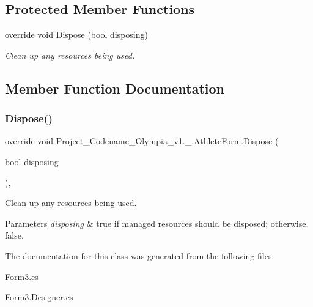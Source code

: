 \subsection*{Protected Member Functions}
\begin{DoxyCompactItemize}
\item 
override void \hyperlink{classProject__Codename__Olympia__v1_1_1__0_1_1AthleteForm_a96cf7be874bb0c7f6e0a0a4039cc19eb}{Dispose} (bool disposing)
\begin{DoxyCompactList}\small\item\em Clean up any resources being used. \end{DoxyCompactList}\end{DoxyCompactItemize}


\subsection{Member Function Documentation}
\mbox{\label{classProject__Codename__Olympia__v1_1_1__0_1_1AthleteForm_a96cf7be874bb0c7f6e0a0a4039cc19eb}} 
\subsubsection{\texorpdfstring{Dispose()}{Dispose()}}
{\footnotesize\ttfamily override void Project\+\_\+\+Codename\+\_\+\+Olympia\+\_\+v1.\+\_.\+Athlete\+Form.\+Dispose (\begin{DoxyParamCaption}\item[{bool}]{disposing }\end{DoxyParamCaption})\hspace{0.3cm}{\ttfamily [inline]}, {\ttfamily [protected]}}



Clean up any resources being used. 


\begin{DoxyParams}{Parameters}
{\em disposing} & true if managed resources should be disposed; otherwise, false.\\
\hline
\end{DoxyParams}


The documentation for this class was generated from the following files\+:\begin{DoxyCompactItemize}
\item 
Form3.\+cs\item 
Form3.\+Designer.\+cs\end{DoxyCompactItemize}
